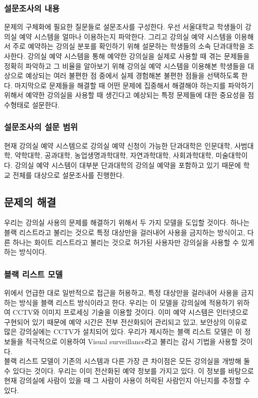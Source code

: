 \documentclass[11pt,a4paper]{article}
\begin{document}
\subsubsection{설문조사의 내용}
문제의 구체화에 필요한 질문들로 설문조사를 구성한다. 우선 서울대학교 학생들이 강의실 예약 시스템을 얼마나 이용하는지 파악한다. 그리고 강의실 예약 시스템을 이용해서 주로 예약하는 강의실 분포를 확인하기 위해 설문하는 학생들의 소속 단과대학을 조사한다.
강의실 예약 시스템을 통해 예약한 강의실을 실제로 사용할 때 겪는 문제들을 정확히 파악하고 그 비율을 알아보기 위해 강의실 예약 시스템을 이용해본 학생들을 대상으로 예상되는 여러 불편한 점 중에서 실제 경험해본 불편한 점들을 선택하도록 한다.
마지막으로 문제들을 해결할 때 어떤 문제에 집중해서 해결해야 하는지를 파악하기 위해서 예약한 강의실을 사용할 때 생긴다고 예상되는 특정 문제들에 대한 중요성을 점수형태로 설문한다.

\subsubsection{설문조사의 설문 범위}
현재 강의실 예약 시스템으로 강의실 예약 신청이 가능한 단과대학은 인문대학, 사범대학, 약학대학, 공과대학, 농업생명과학대학, 자연과학대학, 사회과학대학, 미술대학이다.
강의실 예약 시스템이 대부분 단과대학의 강의실 예약을 포함하고 있기 때문에 학교 전체를 대상으로 설문조사를 진행한다.

\subsection{문제의 해결}
우리는 강의실 사용의 문제를 해결하기 위해서 두 가지 모델을 도입할 것이다. 하나는 블랙 리스트라고 불리는 것으로 특정 대상만을 걸러내어 사용을 금지하는 방식이고, 다른 하나는 화이트 리스트라고 불리는 것으로 허가된 사용자만 강의실을 사용할 수 있게 하는 방식이다.

\subsubsection{블랙 리스트 모델}
위에서 언급한 대로 일반적으로 접근을 허용하고, 특정 대상만을 걸러내어 사용을 금지하는 방식을 블랙 리스트 방식이라고 한다. 우리는 이 모델을 강의실에 적용하기 위하여 CCTV와 이미지 프로세싱 기술을 이용할 것이다. 이미 예약 시스템은 인터넷으로 구현되어 있기 때문에 예약 시간은 전부 전산화되어 관리되고 있고, 보안상의 이유로 많은 강의실에는 CCTV가 설치되어 있다. 우리가 제시하는 블랙 리스트 모델은 이 정보들을 적극적으로 이용하여 Visual surveillance라고 불리는 감시 기법을 사용할 것이다.\\
블랙 리스트 모델이 기존의 시스템과 다른 가장 큰 차이점은 모든 강의실을 개방해 둘 수 있다는 것이다. 우리는 이미 전산화된 예약 정보를 가지고 있다. 이 정보를 바탕으로 현재 강의실에 사람이 있을 때 그 사람이 사용이 허락된 사람인지 아닌지를 추정할 수 있다.
\end{document}

